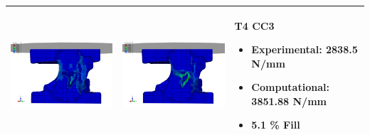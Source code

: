 \documentclass[11pt,a4paper]{article}
\begin{document}
\begin{landscape}
\begin{longtable}{|m{11cm}|m{11cm}|m{4cm}|}
\includegraphics[width=10cm]{images/T4_CC3_postVP_Interface_ABAQUS_All_Side_Stress.png}   & \includegraphics[width=10cm]{images/T4_CC3_postVP_Interface_ABAQUS_All_Side_Strain.png}   & T4 CC3  \begin{itemize} \item Experimental: 	2838.5	N/mm \item Computational:	3851.88
 N/mm \item 5.1 \% Fill \end{itemize} \\ \hline 

\end{longtable}
\end{landscape}
\end{document}
